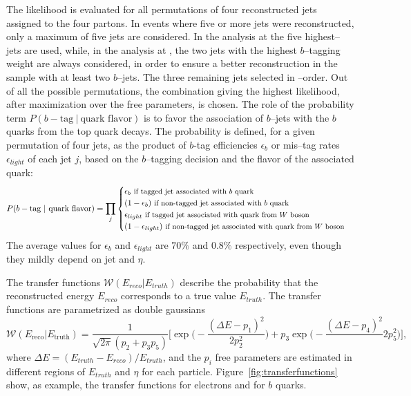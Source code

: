 The likelihood is evaluated for all permutations of four reconstructed
jets assigned to the four partons.
In events where five or more jets were reconstructed, only a maximum
of five jets are considered. In the analysis at \seventev{} the five
highest--\pt{} jets are used, while, in the analysis at \eighttev{}, the two jets with
the highest $b$--tagging weight are always considered, in order to ensure
a better reconstruction in the sample with at least two $b$--jets. The
three remaining jets selected in \pt{}--order.
Out of all the possible permutations, the combination giving the
highest likelihood, after maximization over the free parameters, is chosen.
The role of the probability term $P(b-\textrm{tag} ~|
~\textrm{quark flavor})$ is to favor the association of $b$--jets with
the $b$ quarks from the top quark decays. The probability is defined,
for a given permutation of four jets, as the product of $b$-tag
efficiencies $\epsilon_b$ or mis--tag rates $\epsilon_{light}$ of each
jet $j$, based on the $b$--tagging decision and the flavor of the
associated quark:
\begin{equation}
P(b-\textrm{tag}~|~\textrm{quark flavor}) = \prod_{j}
\begin{cases}
\epsilon_b~\text{\small{if tagged jet associated with $b$ quark}}\\
(1-\epsilon_b)~\text{\small{if non-tagged jet associated with $b$ quark}} \\
\epsilon_{light}~\text{\small{if tagged jet associated with quark from
  $W$ boson}} \\
(1-\epsilon_{light})~\text{\small{if non-tagged jet associated with quark from
  $W$ boson}} \\
\end{cases}
\end{equation}
The average values for $\epsilon_b$ and $\epsilon_{light}$ are $70\%$
and $0.8\%$ respectively, even though they mildly depend on
jet \pt{} and $\eta$. 

The transfer functions $\mathcal{W}(E_{reco}|E_{truth})$ describe the probability that the
reconstructed energy $E_{reco}$ corresponds to a true value
$E_{truth}$.
The transfer functions are parametrized as double gaussians
\begin{equation}
  \label{eq:doublegaus}
  \mathcal{W}(E_\mathrm{reco}|E_\mathrm{truth}) = \frac{1}{\sqrt{2\pi}(p_2+p_3p_5)}\Bigg[ \exp\Bigg(-\frac{(\Delta E - p_1)^2}{2p_2^2}\Bigg) + p_3\exp\Bigg(-\frac{(\Delta E - p_4)^2}\
  {2p_5^2}\Bigg) \Bigg],
\end{equation}
where $\Delta E = (E_{truth}-E_{reco})/E_{truth}$, and the $p_i$
free parameters are estimated in different regions of $E_{truth}$ and
$\eta$ for each particle. Figure~\ref{fig:transferfunctions} show, as
example, the transfer functions for electrons and for $b$ quarks.

